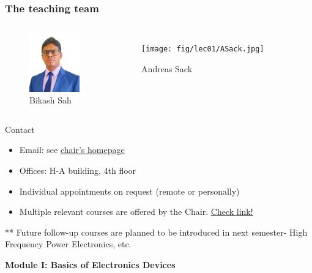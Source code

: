 \begin{frame}
	\frametitle{The teaching team}
	\vspace{-0.5cm}
	\begin{columns}[t]
\centering
		\begin{figure}
			\centering
				\includegraphics[height=2.5cm]{fig/lec01/Bikash.png}
				\caption*{Bikash Sah}
		\end{figure}
	
		\begin{figure}
			\centering
				\texttt{[image: fig/lec01/ASack.jpg]}
				\caption*{Andreas Sack}
		\end{figure}		
	\end{columns}
	\vspace{-0.5cm}
	\begin{varblock}{Contact}
		\begin{itemize}
			\item Email: see \href{https://www.eti.uni-siegen.de/ias/}{chair's homepage}
			\item Offices: H-A building, 4th floor
			\item Individual appointments on request (remote or personally)
            \item Multiple relevant courses are offered by the Chair.  \href{https://www.eti.uni-siegen.de/ias/teaching/}{Check link!}
		\end{itemize}
	\end{varblock}
** \small{Future follow-up courses are planned to be introduced in next semester- High Frequency Power Electronics, etc.}
	\end{frame}



\begin{frame}
\center
\textbf{\huge{Module I: Basics of Electronics Devices}}
\end{frame}

